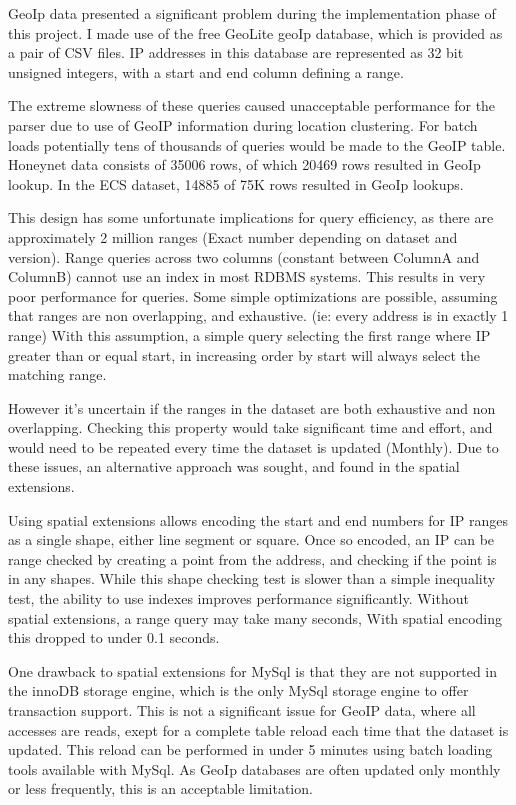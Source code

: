 GeoIp data presented a significant problem during the implementation phase of this project. I made use of the free GeoLite geoIp database, which is provided as a pair of CSV files. IP addresses in this database are represented as 32 bit unsigned integers, with a start and end column defining a range.

The extreme slowness of these queries caused unacceptable performance for the parser due to use of GeoIP information during location clustering. For batch loads potentially tens of thousands of queries would be made to the GeoIP table. Honeynet data consists of 35006 rows, of which 20469 rows resulted in GeoIp lookup. In the ECS dataset, 14885 of 75K rows resulted in GeoIp lookups. 

This design has some unfortunate implications for query efficiency, as there are approximately 2 million ranges (Exact number depending on dataset and version). Range queries across two columns (constant between ColumnA and ColumnB) cannot use an index in most RDBMS systems. This results in very poor performance for queries.
Some simple optimizations are possible, assuming that ranges are non overlapping, and exhaustive. (ie: every address is in exactly 1 range)  With this assumption, a simple query selecting the first range where IP greater than or equal start, in increasing order by start will always select the matching range.

However it's uncertain if the ranges in the dataset are both exhaustive and non overlapping. Checking this property would take significant time and effort, and would need to be repeated  every time the dataset is updated (Monthly). Due to these issues, an alternative approach was sought, and found in the spatial extensions.

Using spatial extensions allows encoding the start and end numbers for IP ranges as a single shape, either line segment or square. Once so encoded, an IP can be range checked by creating a point from the address, and checking if the point is in any shapes. While this shape checking test is slower than a simple inequality test, the ability to use indexes improves performance significantly. Without spatial extensions, a range query may take many seconds, With spatial encoding this dropped to under 0.1 seconds.  

One drawback to spatial extensions for MySql is that they are not supported in the innoDB storage engine, which is the only MySql storage engine to offer transaction support. This is not a significant issue for GeoIP data, where all accesses are reads, exept for a complete table reload each time that the dataset is updated. This reload can be performed in under 5 minutes using batch loading tools available with MySql. As GeoIp databases are often updated only monthly or less frequently, this is an acceptable limitation. 

